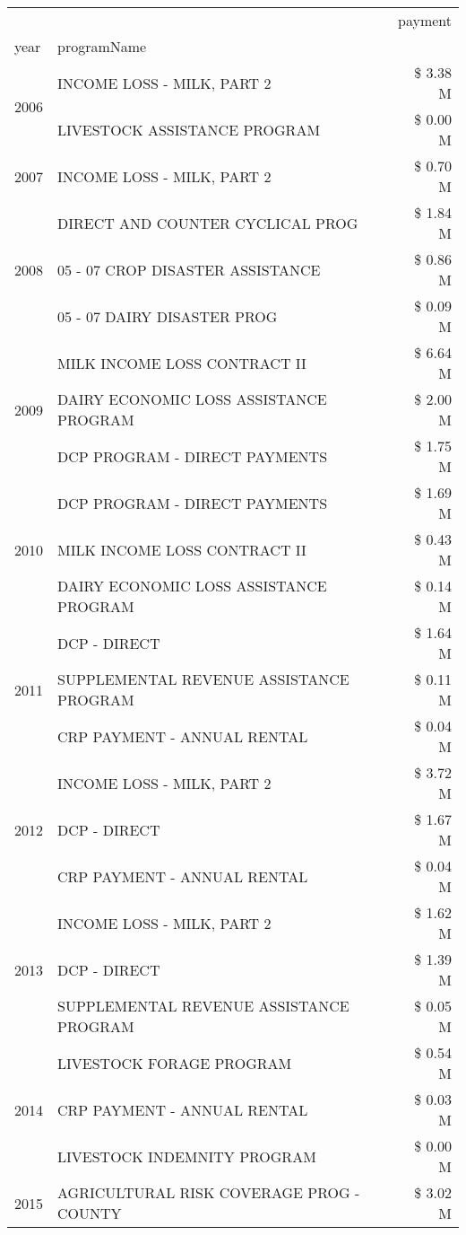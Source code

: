 \begin{tabular}{llr}
\toprule
 &  & payment \\
year & programName &  \\
\midrule
\multirow[t]{2}{*}{2006} & INCOME LOSS - MILK, PART 2 & \$ 3.38 M \\
 & LIVESTOCK ASSISTANCE PROGRAM & \$ 0.00 M \\
\cline{1-3}
2007 & INCOME LOSS - MILK, PART 2 & \$ 0.70 M \\
\cline{1-3}
\multirow[t]{3}{*}{2008} & DIRECT AND COUNTER CYCLICAL PROG & \$ 1.84 M \\
 & 05 - 07 CROP DISASTER ASSISTANCE & \$ 0.86 M \\
 & 05 - 07 DAIRY DISASTER PROG & \$ 0.09 M \\
\cline{1-3}
\multirow[t]{3}{*}{2009} & MILK INCOME LOSS CONTRACT II & \$ 6.64 M \\
 & DAIRY ECONOMIC LOSS ASSISTANCE PROGRAM & \$ 2.00 M \\
 & DCP PROGRAM - DIRECT PAYMENTS & \$ 1.75 M \\
\cline{1-3}
\multirow[t]{3}{*}{2010} & DCP PROGRAM - DIRECT PAYMENTS & \$ 1.69 M \\
 & MILK INCOME LOSS CONTRACT II & \$ 0.43 M \\
 & DAIRY ECONOMIC LOSS ASSISTANCE PROGRAM & \$ 0.14 M \\
\cline{1-3}
\multirow[t]{3}{*}{2011} & DCP - DIRECT & \$ 1.64 M \\
 & SUPPLEMENTAL REVENUE ASSISTANCE PROGRAM & \$ 0.11 M \\
 & CRP PAYMENT - ANNUAL RENTAL & \$ 0.04 M \\
\cline{1-3}
\multirow[t]{3}{*}{2012} & INCOME LOSS - MILK, PART 2 & \$ 3.72 M \\
 & DCP - DIRECT & \$ 1.67 M \\
 & CRP PAYMENT - ANNUAL RENTAL & \$ 0.04 M \\
\cline{1-3}
\multirow[t]{3}{*}{2013} & INCOME LOSS - MILK, PART 2 & \$ 1.62 M \\
 & DCP - DIRECT & \$ 1.39 M \\
 & SUPPLEMENTAL REVENUE ASSISTANCE PROGRAM & \$ 0.05 M \\
\cline{1-3}
\multirow[t]{3}{*}{2014} & LIVESTOCK FORAGE PROGRAM & \$ 0.54 M \\
 & CRP PAYMENT - ANNUAL RENTAL & \$ 0.03 M \\
 & LIVESTOCK INDEMNITY PROGRAM & \$ 0.00 M \\
\cline{1-3}
\multirow[t]{3}{*}{2015} & AGRICULTURAL RISK COVERAGE PROG - COUNTY & \$ 3.02 M \\

\end{tabular}
